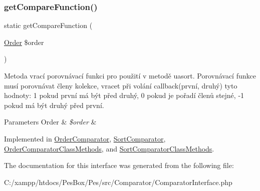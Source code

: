 \subsubsection{\texorpdfstring{get\+Compare\+Function()}{getCompareFunction()}}
{\footnotesize\ttfamily static get\+Compare\+Function (\begin{DoxyParamCaption}\item[{\mbox{\hyperlink{class_pes_1_1_query_1_1_order}{Order}}}]{\$order }\end{DoxyParamCaption})\hspace{0.3cm}{\ttfamily [static]}}

Metoda vrací porovnávací funkci pro použití v metodě uasort. Porovnávací funkce musí porovnávat členy kolekce, vracet při volání callback(první, druhý) tyto hodnoty\+: 1 pokud \textquotesingle{}první\textquotesingle{} má být před \textquotesingle{}druhý\textquotesingle{}, 0 pokud je pořadí členů stejné, -\/1 pokud má být \textquotesingle{}druhý\textquotesingle{} před \textquotesingle{}první\textquotesingle{}. 
\begin{DoxyParams}[1]{Parameters}
Order & {\em \$order} & \\
\hline
\end{DoxyParams}


Implemented in \mbox{\hyperlink{class_pes_1_1_comparator_1_1_order_comparator_a21aeb75d37fce6724b5a60f836dfc85c}{Order\+Comparator}}, \mbox{\hyperlink{class_pes_1_1_comparator_1_1_sort_comparator_a21aeb75d37fce6724b5a60f836dfc85c}{Sort\+Comparator}}, \mbox{\hyperlink{class_pes_1_1_comparator_1_1_order_comparator_class_methods_a21aeb75d37fce6724b5a60f836dfc85c}{Order\+Comparator\+Class\+Methods}}, and \mbox{\hyperlink{class_pes_1_1_comparator_1_1_sort_comparator_class_methods_a21aeb75d37fce6724b5a60f836dfc85c}{Sort\+Comparator\+Class\+Methods}}.



The documentation for this interface was generated from the following file\+:\begin{DoxyCompactItemize}
\item 
C\+:/xampp/htdocs/\+Pes\+Box/\+Pes/src/\+Comparator/Comparator\+Interface.\+php\end{DoxyCompactItemize}
